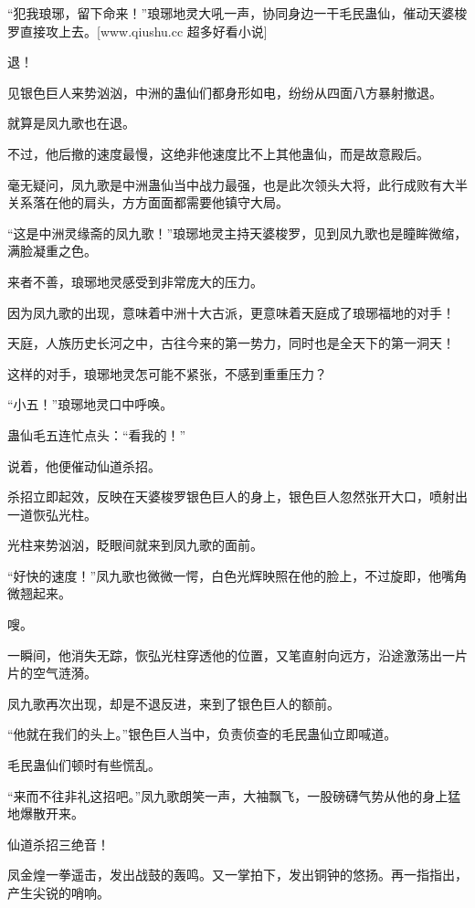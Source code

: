 
\begin{this_body}

“犯我琅琊，留下命来！”琅琊地灵大吼一声，协同身边一干毛民蛊仙，催动天婆梭罗直接攻上去。[www.qiushu.cc 超多好看小说]

退！

见银色巨人来势汹汹，中洲的蛊仙们都身形如电，纷纷从四面八方暴射撤退。

就算是凤九歌也在退。

不过，他后撤的速度最慢，这绝非他速度比不上其他蛊仙，而是故意殿后。

毫无疑问，凤九歌是中洲蛊仙当中战力最强，也是此次领头大将，此行成败有大半关系落在他的肩头，方方面面都需要他镇守大局。

“这是中洲灵缘斋的凤九歌！”琅琊地灵主持天婆梭罗，见到凤九歌也是瞳眸微缩，满脸凝重之色。

来者不善，琅琊地灵感受到非常庞大的压力。

因为凤九歌的出现，意味着中洲十大古派，更意味着天庭成了琅琊福地的对手！

天庭，人族历史长河之中，古往今来的第一势力，同时也是全天下的第一洞天！

这样的对手，琅琊地灵怎可能不紧张，不感到重重压力？

“小五！”琅琊地灵口中呼唤。

蛊仙毛五连忙点头：“看我的！”

说着，他便催动仙道杀招。

杀招立即起效，反映在天婆梭罗银色巨人的身上，银色巨人忽然张开大口，喷射出一道恢弘光柱。

光柱来势汹汹，眨眼间就来到凤九歌的面前。

“好快的速度！”凤九歌也微微一愕，白色光辉映照在他的脸上，不过旋即，他嘴角微翘起来。

嗖。

一瞬间，他消失无踪，恢弘光柱穿透他的位置，又笔直射向远方，沿途激荡出一片片的空气涟漪。

凤九歌再次出现，却是不退反进，来到了银色巨人的额前。

“他就在我们的头上。”银色巨人当中，负责侦查的毛民蛊仙立即喊道。

毛民蛊仙们顿时有些慌乱。

“来而不往非礼这招吧。”凤九歌朗笑一声，大袖飘飞，一股磅礴气势从他的身上猛地爆散开来。

仙道杀招三绝音！

凤金煌一拳遥击，发出战鼓的轰鸣。又一掌拍下，发出铜钟的悠扬。再一指指出，产生尖锐的哨响。


\end{this_body}
